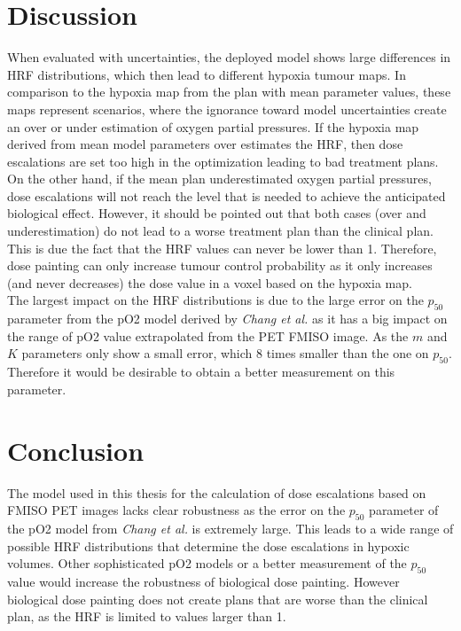 \section{Discussion}
When evaluated with uncertainties, the deployed model shows large differences in HRF distributions, which then lead to different hypoxia tumour maps. In comparison to the hypoxia map from the plan with mean parameter values, these maps represent scenarios, where the ignorance toward model uncertainties create an over or under estimation of oxygen partial pressures. If the hypoxia map derived from mean model parameters over estimates the HRF, then dose escalations are set too high in the optimization leading to bad treatment plans. On the other hand, if the mean plan underestimated oxygen partial pressures, dose escalations will not reach the level that is needed to achieve the anticipated biological effect. However, it should be pointed out that both cases (over and underestimation) do not lead to a worse treatment plan than the clinical plan. This is due the fact that the HRF values can never be lower than 1. Therefore, dose painting can only increase tumour control probability as it only increases (and never decreases) the dose value in a voxel based on the hypoxia map.\\The largest impact on the HRF distributions is due to the large error on the $p_{50}$ parameter from the pO2 model derived by \textit{Chang et al.}\cite{pmid19994538}  as it has a big impact on the range of pO2 value extrapolated from the PET FMISO image. As the $m$ and $K$ parameters only show a small error, which 8 times smaller than the one on $p_{50}$. Therefore it would be desirable to obtain a better measurement on this parameter. 
\section{Conclusion}
The model used in this thesis for the calculation of dose escalations based on FMISO PET images lacks clear robustness as the error on the $p_{50}$ parameter of the pO2 model from \textit{Chang et al.}\cite{pmid19994538} is extremely large. This leads to a wide range of possible HRF distributions that determine the dose escalations in hypoxic volumes. Other sophisticated pO2 models or a better measurement of the $p_{50}$ value would increase the robustness of biological dose painting. However biological dose painting does not create plans that are worse than the clinical plan, as the HRF is limited to values larger than 1.